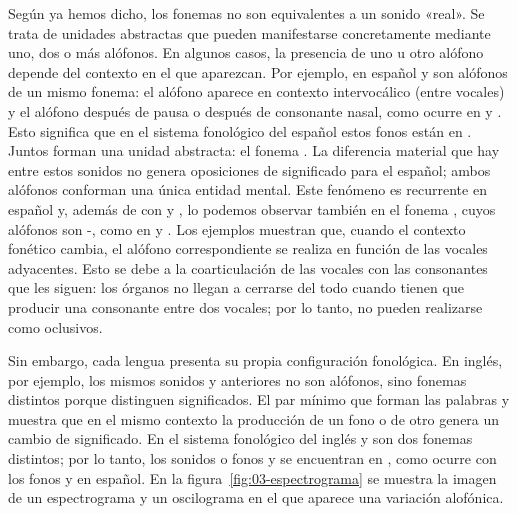 Según ya hemos dicho, los fonemas no son equivalentes a un sonido «real». Se
trata de unidades abstractas que pueden manifestarse concretamente mediante uno,
dos o más alófonos. En algunos casos, la presencia de uno u otro alófono depende
del contexto en el que aparezcan. Por ejemplo, en español  y  son
alófonos de un mismo fonema: el alófono  aparece en contexto
intervocálico (entre vocales) y el alófono  después de pausa o después de
consonante nasal, como ocurre en  y . Esto
significa que en el sistema fonológico del español estos fonos están en
. Juntos forman una unidad abstracta: el
fonema . La diferencia material que hay entre estos sonidos no genera
oposiciones de significado para el español; ambos alófonos conforman una única
entidad mental. Este fenómeno es recurrente en español y, además de con
 y , lo podemos observar también en el fonema , cuyos
alófonos son -, como en  y . Los ejemplos
muestran que, cuando el contexto fonético cambia, el alófono correspondiente se
realiza en función de las vocales adyacentes. Esto se debe a la coarticulación
de las vocales con las consonantes que les siguen: los órganos no llegan a
cerrarse del todo cuando tienen que producir una consonante entre dos vocales;
por lo tanto, no pueden realizarse como oclusivos.

Sin embargo, cada lengua presenta su propia configuración fonológica. En
inglés, por ejemplo, los mismos sonidos  y  anteriores no son
alófonos, sino fonemas distintos porque distinguen significados. El par mínimo
que forman las palabras    y 
  muestra que en el mismo contexto la producción de un fono
o de otro genera un cambio de significado. En el sistema fonológico del inglés
 y  son dos fonemas distintos; por lo tanto, los sonidos o
fonos  y  se encuentran en ,
como ocurre con los fonos  y  en español. En la
figura~\ref{fig:03-espectrograma} se muestra la imagen de un espectrograma y un
oscilograma en el que aparece una variación alofónica.


